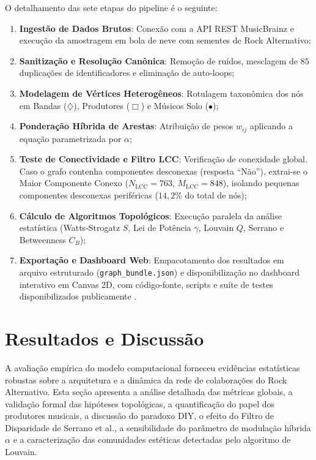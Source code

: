 \documentclass[conference]{IEEEtran}
\begin{document}
O detalhamento das sete etapas do pipeline é o seguinte:
\begin{enumerate}
    \item \textbf{Ingestão de Dados Brutos}: Conexão com a API REST MusicBrainz e execução da amostragem em bola de neve com sementes de Rock Alternativo;
    \item \textbf{Sanitização e Resolução Canônica}: Remoção de ruídos, mesclagem de $85$ duplicações de identificadores e eliminação de auto-loops;
    \item \textbf{Modelagem de Vértices Heterogêneos}: Rotulagem taxonômica dos nós em Bandas ($\diamondsuit$), Produtores ($\Box$) e Músicos Solo ($\bullet$);
    \item \textbf{Ponderação Híbrida de Arestas}: Atribuição de pesos $w_{ij}$ aplicando a equação parametrizada por $\alpha$;
    \item \textbf{Teste de Conectividade e Filtro LCC}: Verificação de conexidade global. Caso o grafo contenha componentes desconexas (resposta ``Não''), extrai-se o Maior Componente Conexo ($N_{\text{LCC}}=763$, $M_{\text{LCC}}=848$), isolando pequenas componentes desconexas periféricas ($14,2\%$ do total de nós);
    \item \textbf{Cálculo de Algoritmos Topológicos}: Execução paralela da análise estatística (Watts-Strogatz $S$, Lei de Potência $\gamma$, Louvain $Q$, Serrano e Betweenness $C_B$);
    \item \textbf{Exportação e Dashboard Web}: Empacotamento dos resultados em arquivo estruturado (\texttt{graph\_bundle.json}) e disponibilização no dashboard interativo em Canvas 2D, com código-fonte, scripts e suíte de testes disponibilizados publicamente \cite{pedro2026repo}.
\end{enumerate}

\section{Resultados e Discussão}

A avaliação empírica do modelo computacional forneceu evidências estatísticas robustas sobre a arquitetura e a dinâmica da rede de colaborações do Rock Alternativo. Esta seção apresenta a análise detalhada das métricas globais, a validação formal das hipóteses topológicas, a quantificação do papel dos produtores musicais, a discussão do paradoxo DIY, o efeito do Filtro de Disparidade de Serrano et al., a sensibilidade do parâmetro de modulação híbrida $\alpha$ e a caracterização das comunidades estéticas detectadas pelo algoritmo de Louvain.
\end{document}
